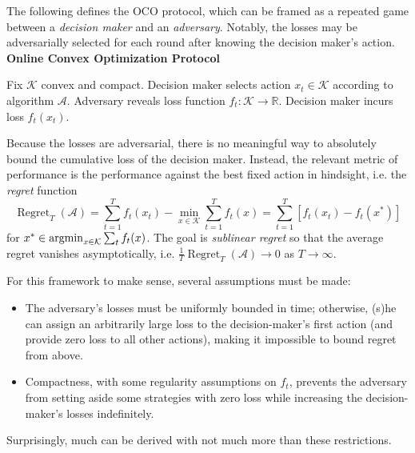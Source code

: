 \documentclass[11pt, letterpaper]{article}
\begin{document}
\begin{concept}
    The following defines the OCO protocol, which can be framed as a repeated game between a \textit{decision maker} and an \textit{adversary}. Notably, the losses may be adversarially selected for each round after knowing the decision maker's action.
    \algline
    \textbf{Online Convex Optimization Protocol}
    \begin{algorithmic}[1]
        \State Fix \(\mathcal{K}\) convex and compact.
            \State Decision maker selects action \(x_t \in \mathcal{K}\) according to algorithm \(\mathcal{A}\).
            \State Adversary reveals loss function \(f_t : \mathcal{K} \to \mathbb{R}\).
            \State Decision maker incurs loss \(f_t(x_t)\).
        \EndFor
    \end{algorithmic}
    \algline
    Because the losses are adversarial, there is no meaningful way to absolutely bound the cumulative loss of the decision maker. Instead, the relevant metric of performance is the performance against the best fixed action in hindsight, i.e. the \textit{regret} function
    \[
        \operatorname{Regret}_T(\mathcal{A}) 
        = \sum_{t=1}^T f_t(x_t) - \min_{x \in \mathcal{K}} \sum_{t=1}^T f_t(x)
        = \sum_{t=1}^T [f_t(x_t) - f_t(x^*)]
    \]
    for \(x^* \in \operatorname*{argmin}_{x \in \mathcal{K}} \sum_t f_t(x)\). The goal is \textit{sublinear regret} so that the average regret vanishes asymptotically, i.e. \(\frac{1}{T} \operatorname{Regret}_T(\mathcal{A}) \to 0\) as \(T \to \infty\).
\end{concept}

\begin{remark}
    For this framework to make sense, several assumptions must be made: 
    \begin{itemize}
        \item The adversary's losses must be uniformly bounded in time; otherwise, (s)he can assign an arbitrarily large loss to the decision-maker's first action (and provide zero loss to all other actions), making it impossible to bound regret from above.
        \item Compactness, with some regularity assumptions on \(f_t\), prevents the adversary from setting aside some strategies with zero loss while increasing the decision-maker's losses indefinitely. 
    \end{itemize}
    Surprisingly, much can be derived with not much more than these restrictions.
\end{remark}
\end{document}

